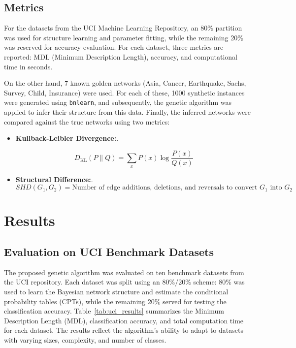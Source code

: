 \documentclass[runningheads]{llncs}
\begin{document}
\subsection{Metrics}

For the datasets from the UCI Machine Learning Repository, an 80\% partition was used for structure learning and parameter fitting, while the remaining 20\% was reserved for accuracy evaluation. For each dataset, three metrics are reported: MDL (Minimum Description Length), accuracy, and computational time in seconds.

On the other hand, 7 known golden networks (Asia, Cancer, Earthquake, Sachs, Survey, Child, Insurance) were used. For each of these, 1000 synthetic instances were generated using \texttt{bnlearn}, and subsequently, the genetic algorithm was applied to infer their structure from this data. Finally, the inferred networks were compared against the true networks using two metrics:

\begin{itemize}
	\item \textbf{Kullback-Leibler Divergence:}.
	
	\begin{equation}
		D_{\text{KL}}(P \parallel Q) = \sum_{x} P(x) \log \frac{P(x)}{Q(x)}
	\end{equation}
	
	\item \textbf{Structural Difference:}.
	\begin{equation}
		SHD(G_1, G_2) = \text{Number of edge additions, deletions, and reversals to convert } G_1 \text{ into } G_2
	\end{equation}
	
	
\end{itemize}


\newpage

\section{Results}

\subsection{Evaluation on UCI Benchmark Datasets}

The proposed genetic algorithm was evaluated on ten benchmark datasets from the UCI repository. Each dataset was split using an 80\%/20\% scheme: 80\% was used to learn the Bayesian network structure and estimate the conditional probability tables (CPTs), while the remaining 20\% served for testing the classification accuracy.
Table~\ref{tab:uci_results} summarizes the Minimum Description Length (MDL), classification accuracy, and total computation time for each dataset. The results reflect the algorithm’s ability to adapt to datasets with varying sizes, complexity, and number of classes.
\end{document}
